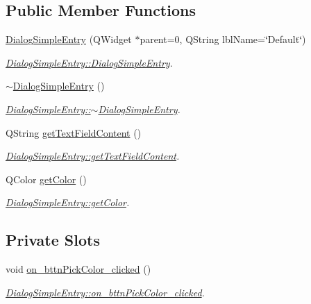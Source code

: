 \subsection*{Public Member Functions}
\begin{DoxyCompactItemize}
\item 
\hyperlink{class_dialog_simple_entry_af0c71a19feee305b6e5c2e637070311a}{Dialog\+Simple\+Entry} (Q\+Widget $\ast$parent=0, Q\+String lbl\+Name=\char`\"{}Default\char`\"{})
\begin{DoxyCompactList}\small\item\em \hyperlink{class_dialog_simple_entry_af0c71a19feee305b6e5c2e637070311a}{Dialog\+Simple\+Entry\+::\+Dialog\+Simple\+Entry}. \end{DoxyCompactList}\item 
\hyperlink{class_dialog_simple_entry_a951b30da780f0409903c76f1efbd91f1}{$\sim$\+Dialog\+Simple\+Entry} ()
\begin{DoxyCompactList}\small\item\em \hyperlink{class_dialog_simple_entry_a951b30da780f0409903c76f1efbd91f1}{Dialog\+Simple\+Entry\+::$\sim$\+Dialog\+Simple\+Entry}. \end{DoxyCompactList}\item 
Q\+String \hyperlink{class_dialog_simple_entry_ab9f80cd88dae4100bfb47b9df2cd02ad}{get\+Text\+Field\+Content} ()
\begin{DoxyCompactList}\small\item\em \hyperlink{class_dialog_simple_entry_ab9f80cd88dae4100bfb47b9df2cd02ad}{Dialog\+Simple\+Entry\+::get\+Text\+Field\+Content}. \end{DoxyCompactList}\item 
Q\+Color \hyperlink{class_dialog_simple_entry_addf576d4bc4e1acbd27743c112f267b1}{get\+Color} ()
\begin{DoxyCompactList}\small\item\em \hyperlink{class_dialog_simple_entry_addf576d4bc4e1acbd27743c112f267b1}{Dialog\+Simple\+Entry\+::get\+Color}. \end{DoxyCompactList}\end{DoxyCompactItemize}
\subsection*{Private Slots}
\begin{DoxyCompactItemize}
\item 
void \hyperlink{class_dialog_simple_entry_a08da9e5b778950ec6cf3172e04d5e4b4}{on\+\_\+bttn\+Pick\+Color\+\_\+clicked} ()
\begin{DoxyCompactList}\small\item\em \hyperlink{class_dialog_simple_entry_a08da9e5b778950ec6cf3172e04d5e4b4}{Dialog\+Simple\+Entry\+::on\+\_\+bttn\+Pick\+Color\+\_\+clicked}. \end{DoxyCompactList}\end{DoxyCompactItemize}
